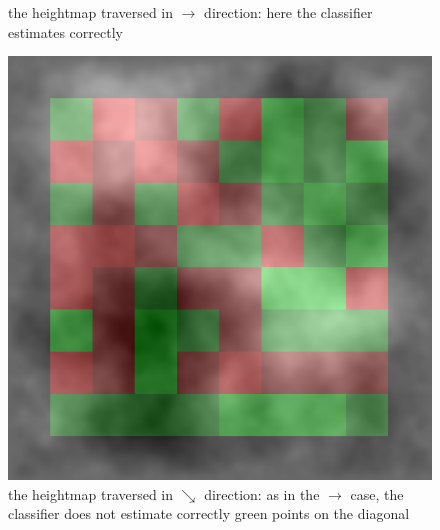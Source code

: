 \documentclass[]{usiinfbachelorproject}
\begin{document}
\begin{figure}[H]
    \caption{the heightmap traversed in $\rightarrow$ direction: here the classifier estimates correctly}\label{fig:heatmap0}
\endminipage\hfill
{}
  \includegraphics[width=\linewidth]{heatmap45}
    \caption{the heightmap traversed in $\searrow$ direction: as in the $\rightarrow$ case, the classifier does not estimate correctly green points on the diagonal}\label{fig:heatmap45}
\endminipage\hfill
\end{figure}
\end{document}
